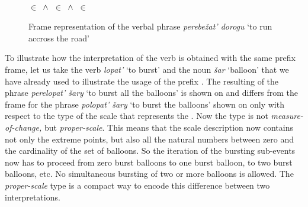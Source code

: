\begin{figure}
\small
\begin{minipage}{0.6\textwidth}
\end{minipage}\hfill%
\begin{minipage}{0.35\textwidth}
\\
\vspace{0.3em}
 $\in$  $\,\wedge\,$  $\in$  $\,\wedge\,$  $\in$ 
\end{minipage}
\caption{Frame representation of the verbal phrase \textit{perebe\v{z}at' dorogu} `to run accross the road' \label{frame:cross:road}}
\end{figure}


To illustrate how the  interpretation of the verb is obtained with the same prefix frame, let us take the verb \textit{lopat'} `to burst' and the noun \textit{\v{s}ar} `balloon' that we have already used to illustrate the  usage of the prefix \mbox{.} The resulting  of the phrase \textit{perelopat' \v{s}ary} `to burst all the balloons' is shown on  and differs from the frame for the phrase \textit{polopat' \v{s}ary} `to burst the balloons' shown on  only with respect to the type of the scale that represents the . Now the type is not \textit{measure-of-change,} but \textit{proper-scale}. This means that the scale description now contains not only the extreme points, but also all the natural numbers between zero and the cardinality of the set of balloons. So the iteration of the bursting sub-events now has to proceed from zero burst balloons to one burst balloon, to two burst balloons, etc. No simultaneous bursting of two or more balloons is allowed. The \textit{proper-scale} type is a compact way to encode this difference between two  interpretations.

